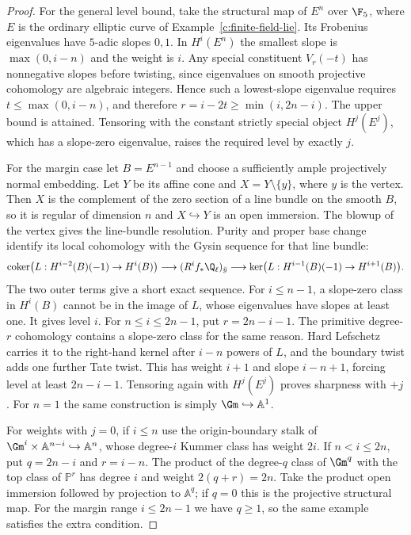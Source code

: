 \begin{proof}
For the general level bound, take the structural map of $E^n$ over $\F_5$, where $E$ is the ordinary elliptic curve of Example~\ref{c:finite-field-lie}. Its Frobenius eigenvalues have $5$-adic slopes $0,1$. In $H^i(E^n)$ the smallest slope is $\max(0,i-n)$ and the weight is $i$. Any special constituent $V_r(-t)$ has nonnegative slopes before twisting, since eigenvalues on smooth projective cohomology are algebraic integers. Hence such a lowest-slope eigenvalue requires $t\leq\max(0,i-n)$, and therefore $r=i-2t\geq\min(i,2n-i)$. The upper bound is attained. Tensoring with the constant strictly special object $H^j(E^j)$, which has a slope-zero eigenvalue, raises the required level by exactly $j$.

For the margin case let $B=E^{n-1}$ and choose a sufficiently ample projectively normal embedding. Let $Y$ be its affine cone and $X=Y\setminus\{y\}$, where $y$ is the vertex. Then $X$ is the complement of the zero section of a line bundle on the smooth $B$, so it is regular of dimension $n$ and $X\hookrightarrow Y$ is an open immersion. The blowup of the vertex gives the line-bundle resolution. Purity and proper base change identify its local cohomology with the Gysin sequence for that line bundle:
\[
 \operatorname{coker}\bigl(L:H^{i-2}(B)(-1)\to H^i(B)\bigr)
 \longrightarrow (R^if_*\Q_\ell)_{\bar y}
 \longrightarrow\ker\bigl(L:H^{i-1}(B)(-1)\to H^{i+1}(B)\bigr).
\]
The two outer terms give a short exact sequence. For $i\leq n-1$, a slope-zero class in $H^i(B)$ cannot be in the image of $L$, whose eigenvalues have slopes at least one. It gives level $i$. For $n\leq i\leq2n-1$, put $r=2n-i-1$. The primitive degree-$r$ cohomology contains a slope-zero class for the same reason. Hard Lefschetz carries it to the right-hand kernel after $i-n$ powers of $L$, and the boundary twist adds one further Tate twist. This has weight $i+1$ and slope $i-n+1$, forcing level at least $2n-i-1$. Tensoring again with $H^j(E^j)$ proves sharpness with $+j$. For $n=1$ the same construction is simply $\Gm\hookrightarrow\mathbb A^1$.

For weights with $j=0$, if $i\leq n$ use the origin-boundary stalk of
$\Gm^i\times\mathbb A^{n-i}\hookrightarrow\mathbb A^n$, whose degree-$i$ Kummer class has weight $2i$. If $n<i\leq2n$, put $q=2n-i$ and $r=i-n$. The product of the degree-$q$ class of $\Gm^q$ with the top class of $\mathbb P^r$ has degree $i$ and weight $2(q+r)=2n$. Take the product open immersion followed by projection to $\mathbb A^q$; if $q=0$ this is the projective structural map. For the margin range $i\leq2n-1$ we have $q\geq1$, so the same example satisfies the extra condition.


\end{proof}
